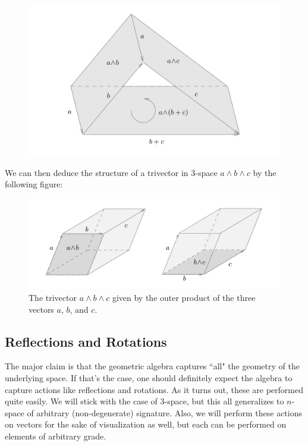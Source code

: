 \begin{figure}[H]
    \centering
    \includegraphics[width=\textwidth]{figures/linearity_out_prod.png}
    \caption{}
    \label{fig:bivector_linearity}
\end{figure}
We can then deduce the structure of a trivector in 3-space $a\wedge b \wedge c$ by the following figure:
\begin{figure}[H]
    \centering
    \includegraphics[width=\textwidth]{figures/trivector.png}
    \caption{The trivector $a\wedge b \wedge c$ given by the outer product of the three vectors $a$, $b$, and $c$.}
    \label{fig:trivector}
\end{figure}



\subsection{Reflections and Rotations}

The major claim is that the geometric algebra captures ``all" the geometry of the underlying space.  If that's the case, one should definitely expect the algebra to capture actions like reflections and rotations. As it turns out, these are performed quite easily. We will stick with the case of 3-space, but this all generalizes to $n$-space of arbitrary (non-degenerate) signature.  Also, we will perform these actions on vectors for the sake of visualization as well, but each can be performed on elements of arbitrary grade.

